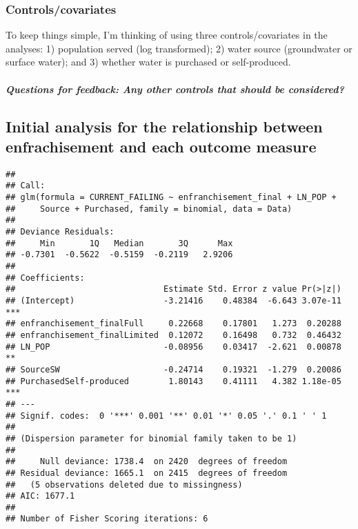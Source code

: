 \documentclass[
]{article}
\begin{document}
\hypertarget{controlscovariates}{%
\subsubsection{Controls/covariates}\label{controlscovariates}}

To keep things simple, I'm thinking of using three controls/covariates
in the analyses: 1) population served (log transformed); 2) water source
(groundwater or surface water); and 3) whether water is purchased or
self-produced.

\hypertarget{questions-for-feedback-any-other-controls-that-should-be-considered}{%
\subparagraph{Questions for feedback: Any other controls that should be
considered?}\label{questions-for-feedback-any-other-controls-that-should-be-considered}}

\hypertarget{initial-analysis-for-the-relationship-between-enfrachisement-and-each-outcome-measure}{%
\subsection{Initial analysis for the relationship between enfrachisement
and each outcome
measure}\label{initial-analysis-for-the-relationship-between-enfrachisement-and-each-outcome-measure}}

\begin{verbatim}
## 
## Call:
## glm(formula = CURRENT_FAILING ~ enfranchisement_final + LN_POP + 
##     Source + Purchased, family = binomial, data = Data)
## 
## Deviance Residuals: 
##     Min       1Q   Median       3Q      Max  
## -0.7301  -0.5622  -0.5159  -0.2119   2.9206  
## 
## Coefficients:
##                              Estimate Std. Error z value Pr(>|z|)    
## (Intercept)                  -3.21416    0.48384  -6.643 3.07e-11 ***
## enfranchisement_finalFull     0.22668    0.17801   1.273  0.20288    
## enfranchisement_finalLimited  0.12072    0.16498   0.732  0.46432    
## LN_POP                       -0.08956    0.03417  -2.621  0.00878 ** 
## SourceSW                     -0.24714    0.19321  -1.279  0.20086    
## PurchasedSelf-produced        1.80143    0.41111   4.382 1.18e-05 ***
## ---
## Signif. codes:  0 '***' 0.001 '**' 0.01 '*' 0.05 '.' 0.1 ' ' 1
## 
## (Dispersion parameter for binomial family taken to be 1)
## 
##     Null deviance: 1738.4  on 2420  degrees of freedom
## Residual deviance: 1665.1  on 2415  degrees of freedom
##   (5 observations deleted due to missingness)
## AIC: 1677.1
## 
## Number of Fisher Scoring iterations: 6
\end{verbatim}
\end{document}
